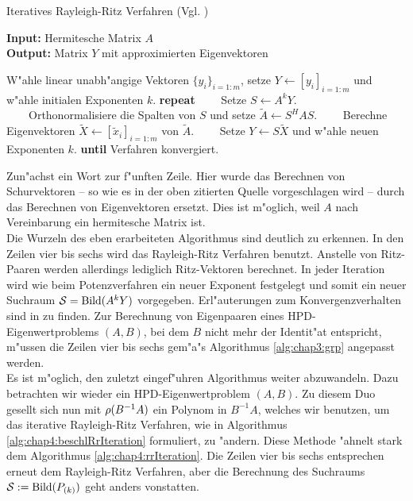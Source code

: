 \begin{algorithm}
\caption{Iteratives Rayleigh-Ritz Verfahren (Vgl. \cite[Algorithmus 5.3, S. 118]{saad})}\label{alg:chap4:rrIteration}
\vspace{.15cm}
\textbf{Input:} Hermitesche Matrix $A$\\
\textbf{Output:} Matrix $Y$ mit approximierten Eigenvektoren
\begin{algorithmic}[1]
\State W"ahle linear unabh"angige Vektoren $\{y_i\}_{i=1:m}$, setze $Y \gets[y_i]_{i=1:m}$ und w"ahle initialen Exponenten $k$.
\State \textbf{repeat}
\State \ \ \ \ Setze $S \gets A^k Y$.
\State \ \ \ \ Orthonormalisiere die Spalten von $S$ und setze $\widetilde{A} \gets S^H A S$.
\State \ \ \ \ Berechne Eigenvektoren $\widetilde{X} \gets [\widetilde{x}_i]_{i=1:m}$ von $\widetilde{A}$.
\State \ \ \ \ Setze $Y \gets S \widetilde{X}$ und w"ahle neuen Exponenten $k$.
\State \textbf{until} Verfahren konvergiert.
\end{algorithmic}
\end{algorithm}

Zun"achst ein Wort zur f"unften Zeile. Hier wurde das Berechnen von Schurvektoren -- so wie es in der oben zitierten Quelle vorgeschlagen wird -- durch das Berechnen von Eigenvektoren ersetzt. Dies ist m"oglich, weil $A$ nach Vereinbarung ein hermitesche Matrix ist.\\%

Die Wurzeln des eben erarbeiteten Algorithmus sind deutlich zu erkennen. In den Zeilen vier bis sechs wird das Rayleigh-Ritz Verfahren benutzt. Anstelle von Ritz-Paaren werden allerdings lediglich Ritz-Vektoren berechnet. In jeder Iteration wird wie beim Potenzverfahren ein neuer Exponent festgelegt und somit ein neuer Suchraum $\mathcal{S} = \operatorname{Bild}(A^k Y)$ vorgegeben. Erl"auterungen zum Konvergenzverhalten sind in \cite[Abschnitt 5]{saad} zu finden. Zur Berechnung von Eigenpaaren eines HPD-Eigenwertproblems $(A,B)$, bei dem $B$ nicht mehr der Identit"at entspricht, m"ussen die Zeilen vier bis sechs gem"a"s Algorithmus \ref{alg:chap3:grp} angepasst werden.\\

Es ist m"oglich, den zuletzt eingef"uhren Algorithmus weiter abzuwandeln. Dazu betrachten wir wieder ein HPD-Eigenwertproblem $(A,B)$. Zu diesem Duo gesellt sich nun mit $\rho(B^{-1}A)$ ein Polynom in $B^{-1}A$, welches wir benutzen, um das iterative Rayleigh-Ritz Verfahren, wie in Algorithmus \ref{alg:chap4:beschlRrIteration} formuliert, zu "andern.
Diese Methode "ahnelt stark dem Algorithmus \ref{alg:chap4:rrIteration}. Die Zeilen vier bis sechs entsprechen erneut dem Rayleigh-Ritz Verfahren, aber die Berechnung des Suchraums $\mathcal{S} := \operatorname{Bild}(P_{(k)})$ geht anders vonstatten.

